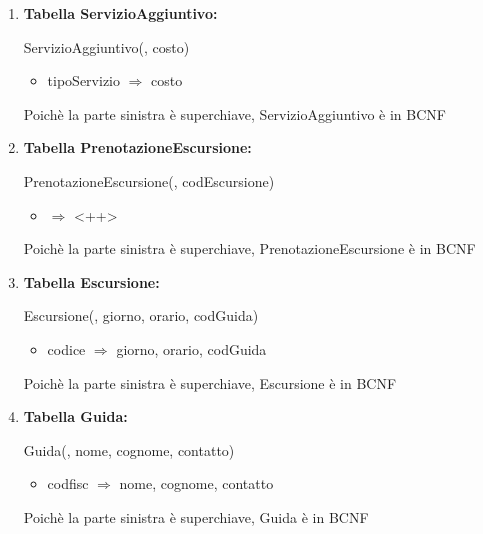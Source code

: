 \documentclass[12pt,a4paper]{article}
\begin{document}
\begin{enumerate}
\item[] \textbf{Tabella ServizioAggiuntivo:}

ServizioAggiuntivo(\underline{}, costo)
\begin{itemize}
\vspace{-5pt}
\item tipoServizio $\Rightarrow$ costo
\vspace{-5pt}
\end{itemize}
Poichè la parte sinistra è superchiave, ServizioAggiuntivo è in BCNF
\vspace{10pt}



\item[] \textbf{Tabella PrenotazioneEscursione:}

PrenotazioneEscursione(\underline{},  codEscursione)
\begin{itemize}
\vspace{-5pt}
\item <++> $\Rightarrow$ <++>
\vspace{-5pt}
\end{itemize}
Poichè la parte sinistra è superchiave, PrenotazioneEscursione è in BCNF
\vspace{10pt}



\item[] \textbf{Tabella Escursione:}

Escursione(\underline{}, giorno, orario,  codGuida)
\begin{itemize}
\vspace{-5pt}
\item codice $\Rightarrow$ giorno, orario, codGuida
\vspace{-5pt}
\end{itemize}
Poichè la parte sinistra è superchiave, Escursione è in BCNF
\vspace{10pt}



\item[] \textbf{Tabella Guida:}

Guida(\underline{}, nome, cognome, contatto)
\begin{itemize}
\vspace{-5pt}
\item codfisc $\Rightarrow$ nome, cognome, contatto
\vspace{-5pt}
\end{itemize}
Poichè la parte sinistra è superchiave, Guida è in BCNF
\vspace{10pt}




\end{enumerate}
\end{document}
